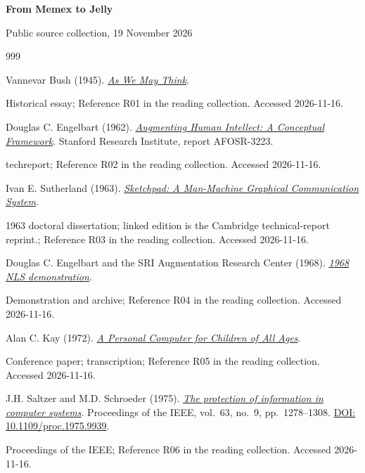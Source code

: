 \documentclass[11pt,letterpaper]{article}
\begin{document}
\begin{center}
  {\Large\bfseries From Memex to Jelly\par}
  \smallskip
  {\small Public source collection, 19 November 2026\par}
\end{center}

\begin{thebibliography}{999}
\setlength{\itemsep}{0.6\baselineskip}

Vannevar Bush (1945).
\href{https://www.w3.org/History/1945/vbush/vbush.shtml}{\emph{As We May Think}}.
\par {\small Historical essay; Reference R01 in the reading collection.}
{\small Accessed 2026-11-16.}

Douglas C. Engelbart (1962).
\href{https://www.dougengelbart.org/pubs/augment-3906.html}{\emph{Augmenting Human Intellect: A Conceptual Framework}}.
Stanford Research Institute, report AFOSR-3223.
\par {\small techreport; Reference R02 in the reading collection.}
{\small Accessed 2026-11-16.}

Ivan E. Sutherland (1963).
\href{https://www.cl.cam.ac.uk/techreports/UCAM-CL-TR-574.html}{\emph{Sketchpad: A Man-Machine Graphical Communication System}}.
\par {\small 1963 doctoral dissertation; linked edition is the Cambridge technical-report reprint.; Reference R03 in the reading collection.}
{\small Accessed 2026-11-16.}

Douglas C. Engelbart and the SRI Augmentation Research Center (1968).
\href{https://dougengelbart.org/mousesite/1968Demo.html}{\emph{1968 NLS demonstration}}.
\par {\small Demonstration and archive; Reference R04 in the reading collection.}
{\small Accessed 2026-11-16.}

Alan C. Kay (1972).
\href{https://mprove.de/visionreality/media/kay72.html}{\emph{A Personal Computer for Children of All Ages}}.
\par {\small Conference paper; transcription; Reference R05 in the reading collection.}
{\small Accessed 2026-11-16.}

J.H. Saltzer and M.D. Schroeder (1975).
\href{https://doi.org/10.1109/proc.1975.9939}{\emph{The protection of information in computer systems}}.
Proceedings of the IEEE, vol.~63, no.~9, pp.~1278--1308.
\href{https://doi.org/10.1109/proc.1975.9939}{DOI: 10.1109/proc.1975.9939}.
\par {\small Proceedings of the IEEE; Reference R06 in the reading collection.}
{\small Accessed 2026-11-16.}


\end{thebibliography}
\end{document}
